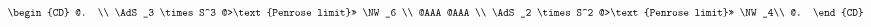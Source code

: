 \begin{equation}
  \begin{CD}
    @. \\
    \AdS_3 \times S^3 @>\text{Penrose limit}>> \NW_6  \\
    @AAA          @AAA \\
    \AdS_2 \times S^2 @>\text{Penrose limit}>> \NW_4\\
    @.
  \end{CD}
\end{equation}

